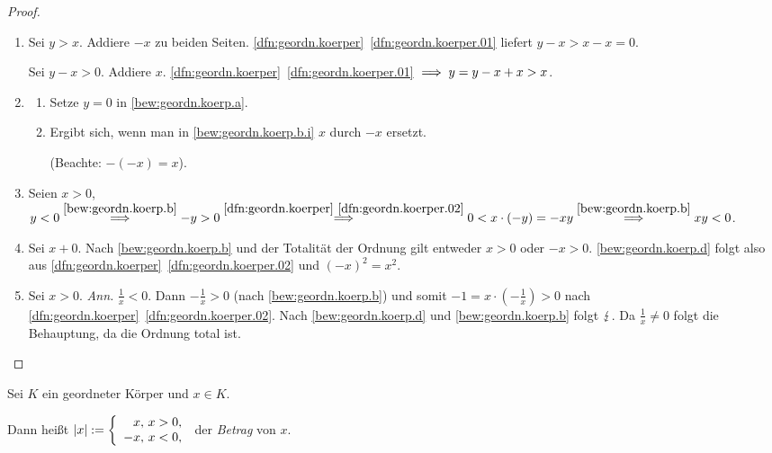 \documentclass[12pt]{scrreprt}
\begin{document}
\begin{proof}
\begin{enumerate} %
\item\label{bew:geordn.koerp.a} Sei $y > x$. Addiere $-x$ zu beiden Seiten. \ref{dfn:geordn.koerper}~\ref{dfn:geordn.koerper.01} liefert $y - x > x - x = 0$.

Sei $y - x > 0$. Addiere $x$. \ref{dfn:geordn.koerper}~\ref{dfn:geordn.koerper.01} $\implies y = y - x + x > x$.

\item\label{bew:geordn.koerp.b} \begin{enumerate} %
	\item\label{bew:geordn.koerp.b.i} Setze $y = 0$ in \ref{bew:geordn.koerp.a}.
	\item Ergibt sich, wenn man in \ref{bew:geordn.koerp.b.i} $x$ durch $-x$ ersetzt.
  
	(Beachte: $-(-x) = x$).
\end{enumerate}

\item Seien $x > 0$, $y < 0 \stackrel{\ref{bew:geordn.koerp.b}}{\implies} -y > 0 \stackrel{\ref{dfn:geordn.koerper}~\ref{dfn:geordn.koerper.02}}{\implies} 0 < x \cdot (-y) = -xy \stackrel{\ref{bew:geordn.koerp.b}}{\implies} xy < 0$.

\item\label{bew:geordn.koerp.d} Sei $x + 0$. Nach \ref{bew:geordn.koerp.b} und der Totalität der Ordnung gilt entweder $x>0$ oder $-x>0$. \ref{bew:geordn.koerp.d} folgt also aus \ref{dfn:geordn.koerper}~\ref{dfn:geordn.koerper.02} und $(-x)^2 = x^2$.

\item Sei $x>0$. \textit{Ann.} $\displaystyle\frac{1}{x} < 0$. Dann $\displaystyle-\frac{1}{x} > 0$ (nach \ref{bew:geordn.koerp.b}) und somit $\displaystyle-1 = x\cdot\left(-\frac{1}{x}\right) > 0$ nach \ref{dfn:geordn.koerper}~\ref{dfn:geordn.koerper.02}. Nach \ref{bew:geordn.koerp.d} und \ref{bew:geordn.koerp.b} folgt $\lightning$. Da $\displaystyle\frac{1}{x} \neq 0$ folgt die Behauptung, da die Ordnung total ist.
\end{enumerate}
\end{proof}

\begin{dfn}\label{dfn:betrag}
Sei $K$ ein geordneter Körper und $x \in K$.

Dann heißt $\displaystyle|x| := \left\{\begin{array}{r @{,\ } l}x&x>0,\\-x&x<0,\\\end{array}\right.$ der \textit{Betrag} von $x$.
\end{dfn}
\end{document}
